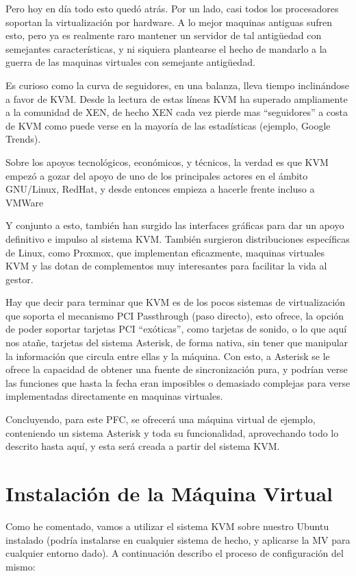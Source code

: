 Pero hoy en día todo esto quedó atrás. Por un lado, casi todos los procesadores soportan la virtualización por hardware. A lo mejor maquinas antiguas sufren esto, pero ya es realmente raro mantener un servidor de tal antigüedad con semejantes características, y ni siquiera plantearse el hecho de mandarlo a la guerra de las maquinas virtuales con semejante antigüedad.

Es curioso como la curva de seguidores, en una balanza, lleva tiempo inclinándose a favor de KVM. Desde la lectura de estas líneas KVM ha superado ampliamente a la comunidad de XEN, de hecho XEN cada vez pierde mas “seguidores” a costa de KVM como puede verse en la mayoría de las estadísticas (ejemplo, Google Trends).

Sobre los apoyos tecnológicos, económicos, y técnicos, la verdad es que KVM empezó a gozar del apoyo de uno de los principales actores en el ámbito GNU/Linux, RedHat, y desde entonces empieza a hacerle frente incluso a VMWare

Y conjunto a esto, también han surgido las interfaces gráficas para dar un apoyo definitivo e impulso al sistema KVM. También surgieron distribuciones específicas de Linux, como Proxmox, que implementan eficazmente, maquinas virtuales KVM y las dotan de complementos muy interesantes para facilitar la vida al gestor.

Hay que decir para terminar que KVM es de los pocos sistemas de virtualización que soporta el mecanismo PCI Passthrough (paso directo), esto ofrece, la opción de poder soportar tarjetas PCI “exóticas”, como tarjetas de sonido, o lo que aquí nos atañe, tarjetas del sistema Asterisk, de forma nativa, sin tener que manipular la información que circula entre ellas y la máquina. Con esto, a Asterisk se le ofrece la capacidad de obtener una fuente de sincronización pura, y podrían verse las funciones que hasta la fecha eran imposibles o demasiado complejas para verse implementadas directamente en maquinas virtuales.

Concluyendo, para este PFC, se ofrecerá una máquina virtual de ejemplo, conteniendo un sistema Asterisk y toda su funcionalidad, aprovechando todo lo descrito hasta aquí, y esta será creada a partir del sistema KVM.

\section{Instalación de la Máquina Virtual}

Como he comentado, vamos a utilizar el sistema KVM sobre nuestro Ubuntu instalado (podría instalarse en cualquier sistema de hecho, y aplicarse la MV para cualquier entorno dado). A continuación describo el proceso de configuración del mismo:

